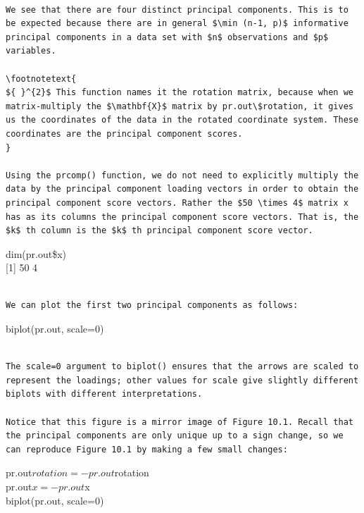 \documentclass[10pt]{article}
\let\svthefootnote\thefootnote
\newcommand\blfootnotetext[1]{%
  \let\thefootnote\relax\footnote{#1}%
  \addtocounter{footnote}{-1}%
  \let\thefootnote\svthefootnote%
}
\let\svfootnotetext\footnotetext
\renewcommand\footnotetext[2][?]{%
  \if\relax#1\relax%
    \ifnum\value{footnote}=0\blfootnotetext{#2}\else\svfootnotetext{#2}\fi%
  \else%
    \if?#1\ifnum\value{footnote}=0\blfootnotetext{#2}\else\svfootnotetext{#2}\fi%
    \else\svfootnotetext[#1]{#2}\fi%
  \fi
}
\begin{document}
\begin{verbatim}

We see that there are four distinct principal components. This is to be expected because there are in general $\min (n-1, p)$ informative principal components in a data set with $n$ observations and $p$ variables.

\footnotetext{
${ }^{2}$ This function names it the rotation matrix, because when we matrix-multiply the $\mathbf{X}$ matrix by pr.out\$rotation, it gives us the coordinates of the data in the rotated coordinate system. These coordinates are the principal component scores.
}

Using the prcomp() function, we do not need to explicitly multiply the data by the principal component loading vectors in order to obtain the principal component score vectors. Rather the $50 \times 4$ matrix x has as its columns the principal component score vectors. That is, the $k$ th column is the $k$ th principal component score vector.
\end{verbatim}

\begin{displayquote}
dim(pr.out\$x)\\[0pt]
[1] 50 4
\end{displayquote}

\begin{verbatim}

We can plot the first two principal components as follows:
\end{verbatim}

\begin{displayquote}
biplot(pr.out, scale=0)
\end{displayquote}

\begin{verbatim}

The scale=0 argument to biplot() ensures that the arrows are scaled to represent the loadings; other values for scale give slightly different biplots with different interpretations.

Notice that this figure is a mirror image of Figure 10.1. Recall that the principal components are only unique up to a sign change, so we can reproduce Figure 10.1 by making a few small changes:
\end{verbatim}

\begin{displayquote}
pr.out$rotation=-pr.out$rotation\\
pr.out$x=-pr.out$x\\
biplot(pr.out, scale=0)
\end{displayquote}
\end{document}
